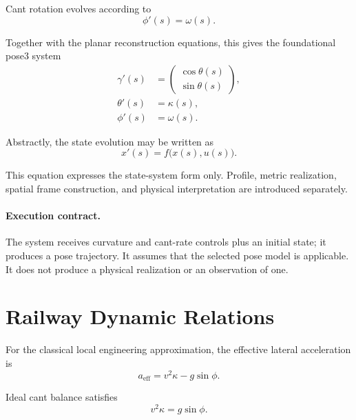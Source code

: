 Cant rotation evolves according to
\begin{equation}
\phi'(s)=\omega(s).
\label{eq:cant-evolution}
\end{equation}

Together with the planar reconstruction equations, this gives the
foundational pose3 system
\begin{equation}
\begin{aligned}
\gamma'(s)
&=
\begin{pmatrix}
\cos\theta(s)\\
\sin\theta(s)
\end{pmatrix},\\
\theta'(s)&=\kappa(s),\\
\phi'(s)&=\omega(s).
\end{aligned}
\label{eq:pose3-system}
\end{equation}

Abstractly, the state evolution may be written as
\begin{equation}
x'(s)=f\bigl(x(s),u(s)\bigr).
\label{eq:general-state-system}
\end{equation}

This equation expresses the state-system form only. Profile, metric
realization, spatial frame construction, and physical interpretation are
introduced separately.

\paragraph{Execution contract.}
The system receives curvature and cant-rate controls plus an initial
state; it produces a pose trajectory. It assumes that the selected
pose model is applicable. It does not produce a physical realization or
an observation of one.

\section{Railway Dynamic Relations}

For the classical local engineering approximation, the effective
lateral acceleration is
\begin{equation}
a_{\mathrm{eff}}
=
v^2\kappa-g\sin\phi.
\label{eq:effective-lateral-acceleration}
\end{equation}

Ideal cant balance satisfies
\begin{equation}
v^2\kappa=g\sin\phi.
\label{eq:cant-equilibrium}
\end{equation}

